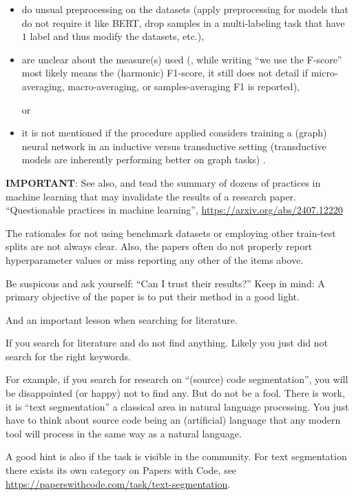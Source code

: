 \documentclass[sigconf, review, nonacm]{acmart}
\begin{document}
\begin{tcolorbox}[title=Instructions]
\begin{itemize}
\item do unsual preprocessing on the datasets (\eg apply preprocessing for models that do not require it like BERT, drop samples in a multi-labeling task that have $1$ label and thus modify the datasets, etc.),
%

\item are unclear about the measure(s) used (\eg, while writing ``we use the F-score'' most likely means the (harmonic) F1-score, it still does not detail if micro-averaging, macro-averaging, or samples-averaging F1 is reported),
%

or

\item it is not mentioned if the procedure applied considers training a (graph) neural network in an inductive versus transductive setting (transductive models are inherently performing better on graph tasks)
%
.


\end{itemize}

\textbf{IMPORTANT}: See also, and tead the summary of dozens of practices in machine learning that may invalidate the results of a research paper.
%
``Questionable practices in machine learning'', \url{https://arxiv.org/abs/2407.12220}

\end{tcolorbox}

The rationales for not using benchmark datasets or employing other train-test splits are not always clear.
Also, the papers often do not properly report hyperparameter values or miss reporting any other of the items above.

\begin{tcolorbox}[title=As a general rule when reading related work]

Be suspicous and ask yourself: ``Can I trust their results?''
Keep in mind: A primary objective of the paper is to put their method in a good light.
\end{tcolorbox}

And an important lesson when searching for literature.

\begin{tcolorbox}[title=Lesson learned (once) again!]
If you search for literature and do not find anything. Likely you just did not search for the right keywords.

For example, if you search for research on ``(source) code segmentation'', you will be disappointed (or happy) not to find any.
But do not be a fool. 
There is work, it is ``text segmentation'' a classical area in natural language processing.
You just have to think about source code being an (artificial) language that any modern tool will process in the same way as a natural language.

A good hint is also if the task is visible in the community.
For text segmentation there exists its own category on Papers with Code, see \url{https://paperswithcode.com/task/text-segmentation}.
\end{tcolorbox}
\end{document}
